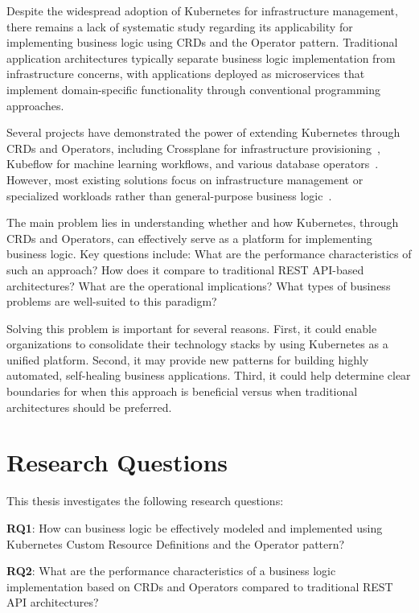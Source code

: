 Despite the widespread adoption of Kubernetes for infrastructure management, there remains a lack of systematic study regarding its applicability for implementing business logic using CRDs and the Operator pattern. Traditional application architectures typically separate business logic implementation from infrastructure concerns, with applications deployed as microservices that implement domain-specific functionality through conventional programming approaches.

Several projects have demonstrated the power of extending Kubernetes through CRDs and Operators, including Crossplane for infrastructure provisioning~\cite{crossplane}, Kubeflow for machine learning workflows, and various database operators~\cite{openshift_operators_lifecycle}. However, most existing solutions focus on infrastructure management or specialized workloads rather than general-purpose business logic~\cite{kubebuilder}.

The main problem lies in understanding whether and how Kubernetes, through CRDs and Operators, can effectively serve as a platform for implementing business logic. Key questions include: What are the performance characteristics of such an approach? How does it compare to traditional REST API-based architectures? What are the operational implications? What types of business problems are well-suited to this paradigm?

Solving this problem is important for several reasons. First, it could enable organizations to consolidate their technology stacks by using Kubernetes as a unified platform. Second, it may provide new patterns for building highly automated, self-healing business applications. Third, it could help determine clear boundaries for when this approach is beneficial versus when traditional architectures should be preferred.

\section{Research Questions}

This thesis investigates the following research questions:

\textbf{RQ1}: How can business logic be effectively modeled and implemented using Kubernetes Custom Resource Definitions and the Operator pattern?

\textbf{RQ2}: What are the performance characteristics of a business logic implementation based on CRDs and Operators compared to traditional REST API architectures?


